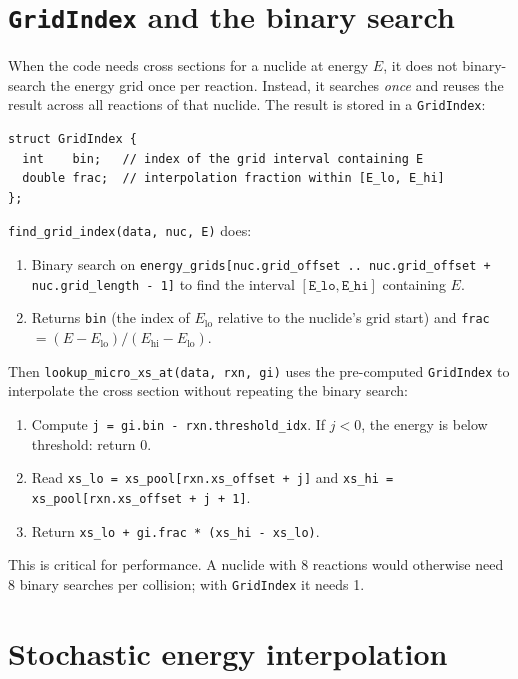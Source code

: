 \documentclass[11pt,a4paper]{article}
\begin{document}
\section{\texttt{GridIndex} and the binary search}
\label{sec:gridindex}

When the code needs cross sections for a nuclide at energy $E$, it does not binary-search the energy grid once per reaction. Instead, it searches \emph{once} and reuses the result across all reactions of that nuclide. The result is stored in a \texttt{GridIndex}:

\begin{lstlisting}
struct GridIndex {
  int    bin;   // index of the grid interval containing E
  double frac;  // interpolation fraction within [E_lo, E_hi]
};
\end{lstlisting}

\texttt{find\_grid\_index(data, nuc, E)} does:
\begin{enumerate}[leftmargin=1.4em]
  \item Binary search on \texttt{energy\_grids[nuc.grid\_offset .. nuc.grid\_offset + nuc.grid\_length - 1]} to find the interval $[\texttt{E\_lo}, \texttt{E\_hi}]$ containing $E$.
  \item Returns \texttt{bin} (the index of $E_\text{lo}$ relative to the nuclide's grid start) and \texttt{frac} $= (E - E_\text{lo}) / (E_\text{hi} - E_\text{lo})$.
\end{enumerate}

Then \texttt{lookup\_micro\_xs\_at(data, rxn, gi)} uses the pre-computed \texttt{GridIndex} to interpolate the cross section without repeating the binary search:
\begin{enumerate}[leftmargin=1.4em]
  \item Compute \texttt{j = gi.bin - rxn.threshold\_idx}. If $j < 0$, the energy is below threshold: return 0.
  \item Read \texttt{xs\_lo = xs\_pool[rxn.xs\_offset + j]} and \texttt{xs\_hi = xs\_pool[rxn.xs\_offset + j + 1]}.
  \item Return \texttt{xs\_lo + gi.frac * (xs\_hi - xs\_lo)}.
\end{enumerate}

This is critical for performance. A nuclide with 8 reactions would otherwise need 8 binary searches per collision; with \texttt{GridIndex} it needs 1.

\section{Stochastic energy interpolation}
\label{sec:stoch-interp}
\end{document}
